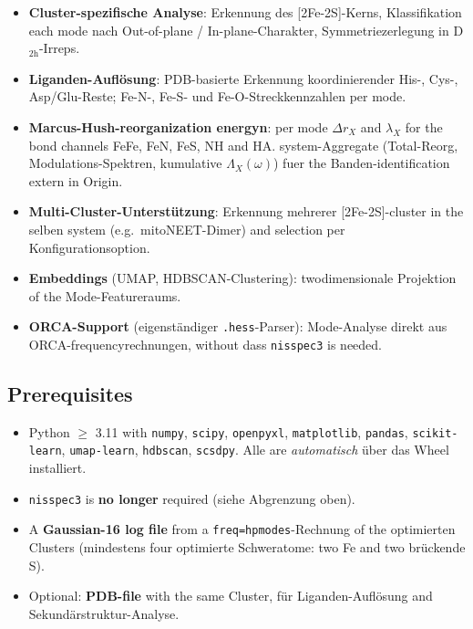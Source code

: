\documentclass[11pt,a4paper,twoside]{article}
\theoremstyle{remark}
\begin{document}
\begin{itemize}
  \item \textbf{Cluster-spezifische Analyse}: Erkennung des
        {[}2Fe-2S{]}-Kerns, Klassifikation each mode nach
        Out-of-plane / In-plane-Charakter, Symmetriezerlegung in
        D$_\mathrm{2h}$-Irreps.
  \item \textbf{Liganden-Aufl\"osung}: PDB-basierte Erkennung
        koordinierender His-, Cys-, Asp/Glu-Reste; Fe-N-, Fe-S- und
        Fe-O-Streckkennzahlen per mode.
  \item \textbf{Marcus-Hush-reorganization energyn}: per mode
        $\Delta r_X$ and $\lambda_X$ for the bond channels FeFe,
        FeN, FeS, NH and HA. system-Aggregate (Total-Reorg,
        Modulations-Spektren, kumulative $\Lambda_X(\omega)$) fuer
        the Banden-identification extern in Origin.
  \item \textbf{Multi-Cluster-Unterst\"utzung}: Erkennung mehrerer
        {[}2Fe-2S{]}-cluster in the selben system (e.g.\ mitoNEET-Dimer)
        and selection per Konfigurationsoption.
  \item \textbf{Embeddings} (UMAP, HDBSCAN-Clustering):
        twodimensionale Projektion of the Mode-Featureraums.
  \item \textbf{ORCA-Support} (eigenst\"andiger \texttt{.hess}-Parser):
        Mode-Analyse direkt aus ORCA-frequencyrechnungen, without dass
        \texttt{nisspec3} is needed.
\end{itemize}

\subsection{Prerequisites}

\begin{itemize}
  \item Python $\geq$ 3.11 with \texttt{numpy}, \texttt{scipy},
        \texttt{openpyxl}, \texttt{matplotlib}, \texttt{pandas},
        \texttt{scikit-learn}, \texttt{umap-learn}, \texttt{hdbscan},
        \texttt{scsdpy}. Alle are \emph{automatisch} \"uber das
        Wheel installiert.
  \item \texttt{nisspec3} is \textbf{no longer} required (siehe
        Abgrenzung oben).
  \item A \textbf{Gaussian-16 log file} from a
        \texttt{freq=hpmodes}-Rechnung of the optimierten Clusters
        (mindestens four optimierte Schweratome: two Fe and two
        br\"uckende S).
  \item Optional: \textbf{PDB-file} with the same Cluster, f\"ur
        Liganden-Aufl\"osung and Sekund\"arstruktur-Analyse.
\end{itemize}
\end{document}
